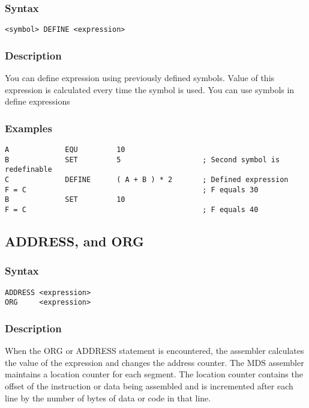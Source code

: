         \subsubsection{Syntax}
            \verb'<symbol> DEFINE <expression>'

        \subsubsection{Description}
            You can define expression using previously defined symbols. Value of this expression is calculated every time the symbol is used. You can use symbols in define expressions

        \subsubsection{Examples}
            \verb'A             EQU         10'\\
            \verb'B             SET         5                   ; Second symbol is redefinable'\\
            \verb'C             DEFINE      ( A + B ) * 2       ; Defined expression'\\
            \verb'F = C                                         ; F equals 30'\\
            \verb'B             SET         10'\\
            \verb'F = C                                         ; F equals 40'

    \subsection{ADDRESS, and ORG}
        \subsubsection{Syntax}
            \verb'ADDRESS <expression>'\\
            \verb'ORG     <expression>'

        \subsubsection{Description}
            When the ORG or ADDRESS statement is encountered, the assembler calculates the value of the expression and changes the address counter. The MDS assembler maintains a location counter for each segment. The location counter contains the offset of the instruction or data being assembled and is incremented after each line by the number of bytes of data or code in that line.

